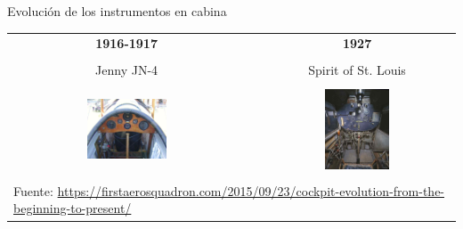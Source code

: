 \begin{frame}{Evoluci\'on de los instrumentos en cabina}
  
  \begin{tabular}{ccc}
    {\bf \large 1916-1917} & & {\bf \large 1927} \\ & & \\
	{Jenny JN-4} & & {Spirit of St. Louis } \\ & & \\
    \includegraphics[width=0.35\textwidth]{imagenes/1.1.introduccion/curtiss_jenny_tablero.jpg}
	& \hspace{5mm}
	&\includegraphics[width=0.35\textwidth]{imagenes/1.1.introduccion/002-lingbergs-spirit-of-st-louis.jpg} \\ & & \\
	\multicolumn{3}{l}{
	{\tiny Fuente: \url{https://firstaerosquadron.com/2015/09/23/cockpit-evolution-from-the-beginning-to-present/}}
}
	\\
  \end{tabular}

\end{frame}


